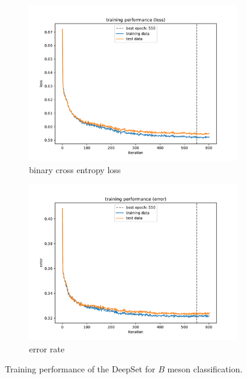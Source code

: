 \begin{figure}
    \centering
    \begin{subfigure}{0.5\textwidth}
        \centering
        \includegraphics[width=\textwidth]{images/B_history_loss.pdf}
        \caption{binary cross entropy loss}
    \end{subfigure}%
    \begin{subfigure}{0.5\textwidth}
        \centering
        \includegraphics[width=\textwidth]{images/B_history_error.pdf}
        \caption{error rate}
    \end{subfigure}%
    \caption{Training performance of the DeepSet for $B$ meson classification.}
    \label{fig:B_history}
\end{figure}

